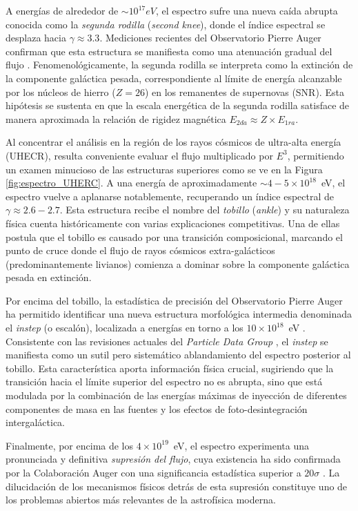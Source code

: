 A energías de alrededor de $\sim 10^{17}eV$, el espectro sufre una nueva caída abrupta conocida como la \textit{segunda rodilla} (\textit{second knee}), donde el índice espectral se desplaza hacia $\gamma \approx 3.3$. Mediciones recientes del Observatorio Pierre Auger confirman que esta estructura se manifiesta como una atenuación gradual del flujo \cite{augerSpectrum2020}. Fenomenológicamente, la segunda rodilla se interpreta como la extinción de la componente galáctica pesada, correspondiente al límite de energía alcanzable por los núcleos de hierro ($Z=26$) en los remanentes de supernovas (SNR). Esta hipótesis se sustenta en que la escala energética de la segunda rodilla satisface de manera aproximada la relación de rigidez magnética $E_{2da} \approx Z \times E_{1ra}$.

Al concentrar el análisis en la región de los rayos cósmicos de ultra-alta energía (UHECR), resulta conveniente evaluar el flujo multiplicado por $E^3$, permitiendo un examen minucioso de las estructuras superiores como se ve en la Figura \ref{fig:espectro_UHERC}. A una energía de aproximadamente $\sim 4 - 5 \times 10^{18}$~eV, el espectro vuelve a aplanarse notablemente, recuperando un índice espectral de $\gamma \approx 2.6 - 2.7$. Esta estructura recibe el nombre del \textit{tobillo} (\textit{ankle}) y su naturaleza física cuenta históricamente con varias explicaciones competitivas. Una de ellas postula que el tobillo es causado por una transición composicional, marcando el punto de cruce donde el flujo de rayos cósmicos extra-galácticos (predominantemente livianos) comienza a dominar sobre la componente galáctica pesada en extinción.

Por encima del tobillo, la estadística de precisión del Observatorio Pierre Auger ha permitido identificar una nueva estructura morfológica intermedia denominada el \textit{instep} (o escalón), localizada a energías en torno a los $10 \times 10^{18}$~eV \cite{augerSpectrum2020}. Consistente con las revisiones actuales del \textit{Particle Data Group} \cite{PDG2024}, el \textit{instep} se manifiesta como un sutil pero sistemático ablandamiento del espectro posterior al tobillo. Esta característica aporta información física crucial, sugiriendo que la transición hacia el límite superior del espectro no es abrupta, sino que está modulada por la combinación de las energías máximas de inyección de diferentes componentes de masa en las fuentes y los efectos de foto-desintegración intergaláctica.

Finalmente, por encima de los $4 \times 10^{19}$~eV, el espectro experimenta una pronunciada y definitiva \textit{supresión del flujo}, cuya existencia ha sido confirmada por la Colaboración Auger con una significancia estadística superior a $20\sigma$ \cite{augerSpectrum2020}. La dilucidación de los mecanismos físicos detrás de esta supresión constituye uno de los problemas abiertos más relevantes de la astrofísica moderna. 

